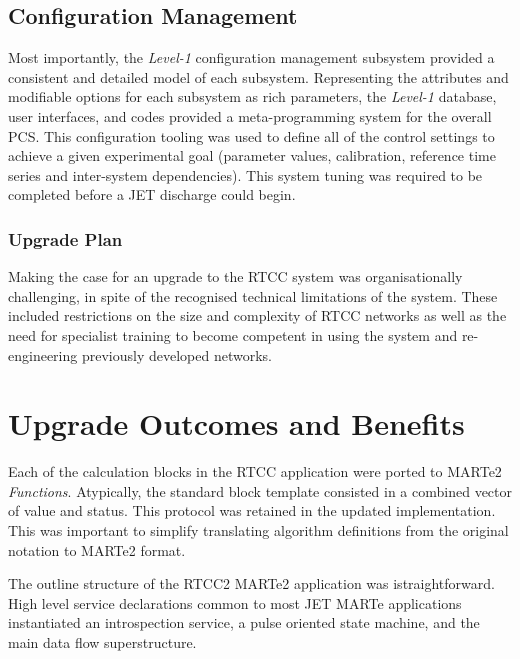 \documentclass[preprint,12pt]{elsarticle}
\begin{document}
\subsection{Configuration Management}

  Most importantly, the {\em Level-1} configuration management subsystem provided a consistent and detailed model of each subsystem. Representing the attributes and modifiable options for each subsystem as rich parameters, the {\em Level-1} database, user interfaces, and codes provided a meta-programming system for the overall PCS.  This configuration tooling was
used to define all of the control settings to achieve a given experimental goal (parameter values, calibration, reference time series and inter-system dependencies).  This system tuning was required to be completed before a JET discharge could begin.  

 

\subsubsection{Upgrade Plan}

Making the case for an upgrade to the RTCC system was organisationally
challenging, in spite of the recognised technical limitations of the system.
These included restrictions on the size and complexity of RTCC networks
as well as the need for specialist training to become competent in
using the system and re-engineering previously developed networks.



\section{Upgrade Outcomes and Benefits}

Each of the calculation blocks in the RTCC application were ported to MARTe2 {\em Functions}.
Atypically, the standard block template consisted in a combined vector of value and status.
This protocol was retained in the updated implementation. This was important to simplify
translating algorithm definitions from the original notation to MARTe2 format.

The outline structure of the RTCC2 MARTe2 application was istraightforward.
High level service declarations common to most JET MARTe applications
instantiated an introspection service, a pulse oriented state machine, 
and the main data flow superstructure.
\end{document}
